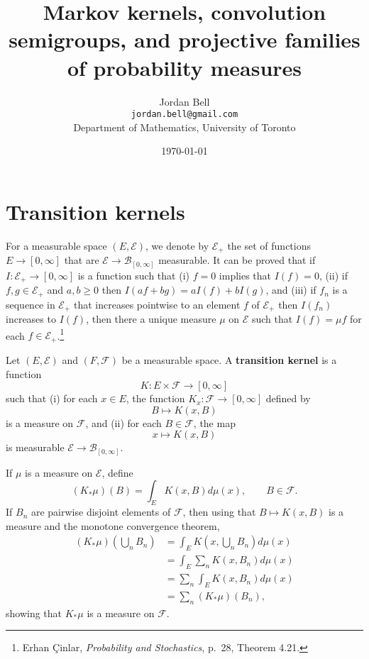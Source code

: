 \documentclass{article}
\theoremstyle{definition}
\begin{document}
\title{Markov kernels, convolution semigroups, and projective families of probability measures}
\author{Jordan Bell\\ \texttt{jordan.bell@gmail.com}\\Department of Mathematics, University of Toronto}
\date{\today}

\maketitle


\section{Transition kernels}
For a measurable space $(E,\mathscr{E})$, we denote by $\mathscr{E}_+$ the set of functions $E \to [0,\infty]$
that are $\mathscr{E} \to \mathscr{B}_{[0,\infty]}$ measurable. 
It can be proved that if $I:\mathscr{E}_+ \to [0,\infty]$ is a function such that
(i) $f=0$ implies that $I(f)=0$, (ii) if $f,g \in \mathscr{E}_+$ and $a,b \geq 0$ then
$I(af+bg)=aI(f)+bI(g)$, and (iii)
if $f_n$ is a sequence in $\mathscr{E}_+$ that increases pointwise to an element $f$ of $\mathscr{E}_+$ then
$I(f_n)$ increases to $I(f)$,
then there a unique measure $\mu$ on $\mathscr{E}$ such that
$I(f)=\mu f$ for each $f \in \mathscr{E}_+$.\footnote{Erhan \c{C}inlar, {\em Probability and Stochastics}, p.~28, Theorem 4.21.}


Let $(E,\mathscr{E})$ and $(F,\mathscr{F})$ be a measurable space. A \textbf{transition kernel} is a function
\[
K:E \times \mathscr{F} \to [0,\infty]
\]
such that 
(i) for each $x \in E$, the function $K_x:\mathscr{F} \to [0,\infty]$ defined by
\[
B \mapsto K(x,B)
\]
is a   measure on $\mathscr{F}$, and (ii)
for each $B \in \mathscr{F}$,   the map
\[
x \mapsto K(x,B)
\]
is measurable $\mathscr{E} \to \mathscr{B}_{[0,\infty]}$.

If $\mu$ is a  measure on $\mathscr{E}$, define
\[
(K_* \mu)(B) = \int_E K(x,B) d\mu(x), \qquad B \in \mathscr{F}.
\]
If $B_n$ are pairwise disjoint elements of $\mathscr{F}$, then using that
$B \mapsto K(x,B)$ is a  measure and the monotone convergence theorem,
\begin{align*}
(K_* \mu)\left(\bigcup_n B_n \right)&=\int_E K\left(x, \bigcup_n B_n \right) d\mu(x)\\
&=\int_E \sum_n K(x,B_n) d\mu(x)\\
&=\sum_n \int_E K(x,B_n) d\mu(x)\\
&=\sum_n (K_* \mu)(B_n),
\end{align*}
showing that $K_*\mu$ is a  measure on $\mathscr{F}$.
\end{document}
